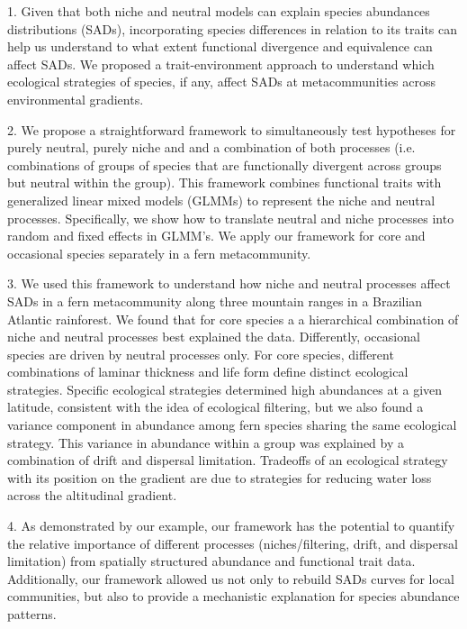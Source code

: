 \documentclass[12pt]{article}
\begin{document}

1. Given that both niche and neutral models can explain species abundances distributions (SADs), incorporating species differences in relation to its traits can help us understand to what extent functional divergence and equivalence can affect SADs. We proposed a trait-environment approach to understand which ecological strategies of species, if any, affect SADs at metacommunities across environmental gradients. 

2. We propose a straightforward framework to simultaneously test hypotheses for purely neutral, purely niche and and a combination of both processes (i.e. combinations of groups of species that are functionally divergent across groups but neutral within the group). This framework combines functional traits with generalized linear mixed models (GLMMs) to represent the niche and neutral processes. Specifically, we show how to translate neutral and niche processes into random and fixed effects in GLMM's. We apply our framework for core and occasional species separately in a fern metacommunity. %

3. We used this framework to understand how niche and neutral processes affect SADs in a fern metacommunity along three mountain ranges in a Brazilian Atlantic rainforest. We found that for core species a a hierarchical combination of niche and neutral processes best explained the data. Differently, occasional species are driven by neutral processes only. %
For core species, different combinations of laminar thickness and life form define distinct ecological strategies. Specific ecological strategies determined high abundances at a given latitude, consistent with the idea of ecological filtering, but we also found a variance component in abundance among fern species sharing the same ecological strategy. This variance in abundance within a group was explained by a combination of drift and dispersal limitation. Tradeoffs of an ecological strategy with its position on the gradient are due to strategies for reducing water loss across the altitudinal gradient.

4. As demonstrated by our example, our framework has the potential to quantify the relative importance of different processes (niches/filtering, drift, and dispersal limitation) from spatially structured abundance and functional trait data. Additionally, our framework allowed us not only to rebuild SADs curves for local communities, but also to provide a mechanistic explanation for species abundance patterns. 
\end{document}
